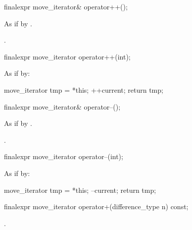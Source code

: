 %
\begin{itemdecl}
finalexpr move_iterator& operator++();
\end{itemdecl}

\begin{itemdescr}
\pnum
\effects As if by .

\pnum
\returns {}.
\end{itemdescr}

%
\begin{itemdecl}
finalexpr move_iterator operator++(int);
\end{itemdecl}

\begin{itemdescr}
\pnum
\effects
As if by:
\begin{codeblock}
move_iterator tmp = *this;
++current;
return tmp;
\end{codeblock}
\end{itemdescr}

%
\begin{itemdecl}
finalexpr move_iterator& operator--();
\end{itemdecl}

\begin{itemdescr}
\pnum
\effects As if by .

\pnum
\returns {}.
\end{itemdescr}

%
\begin{itemdecl}
finalexpr move_iterator operator--(int);
\end{itemdecl}

\begin{itemdescr}
\pnum
\effects
As if by:
\begin{codeblock}
move_iterator tmp = *this;
--current;
return tmp;
\end{codeblock}
\end{itemdescr}

%
\begin{itemdecl}
finalexpr move_iterator operator+(difference_type n) const;
\end{itemdecl}

\begin{itemdescr}
\pnum
\returns {}.
\end{itemdescr}

